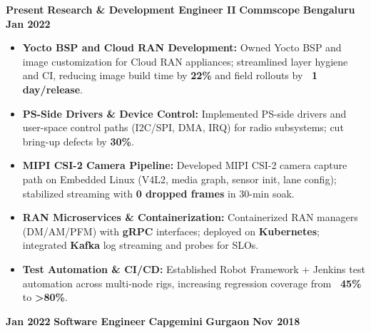 %
%
 \setlength{\parskip}{10pt plus 1pt minus 1pt}

\begin{experiences}
    \small
    \experience
        {\textbf{Present}}   %
        {\textbf{Research \& Development Engineer II}}  %
        {\textbf{Commscope}}  %
        {\textbf{Bengaluru}}  %
        {   %
            \textbf{Jan 2022}  %
        }
        {   %
            \begin{itemize}
                \item \textbf{Yocto BSP and Cloud RAN Development:} Owned Yocto BSP and image customization for Cloud RAN appliances; streamlined layer hygiene and CI, reducing image build time by \textbf{22\%} and field rollouts by \textbf{~1 day/release}.
                \item \textbf{PS-Side Drivers \& Device Control:} Implemented PS-side drivers and user-space control paths (I2C/SPI, DMA, IRQ) for radio subsystems; cut bring-up defects by \textbf{30\%}.
                \item \textbf{MIPI CSI-2 Camera Pipeline:} Developed MIPI CSI-2 camera capture path on Embedded Linux (V4L2, media graph, sensor init, lane config); stabilized streaming with \textbf{0 dropped frames} in 30-min soak.
                \item \textbf{RAN Microservices \& Containerization:} Containerized RAN managers (DM/AM/PFM) with \textbf{gRPC} interfaces; deployed on \textbf{Kubernetes}; integrated \textbf{Kafka} log streaming and probes for SLOs.
                \item \textbf{Test Automation \& CI/CD:} Established Robot Framework + Jenkins test automation across multi-node rigs, increasing regression coverage from \textbf{~45\%} to \textbf{>80\%}.
            \end{itemize}
        }
        {}
    \experience
        {\textbf{Jan 2022}}   %
        {\textbf{Software Engineer}}  %
        {\textbf{Capgemini}}  %
        {\textbf{Gurgaon}}  %
        {   %
            \textbf{Nov 2018}  %
        }
        {   %
            \begin{itemize}

\end{itemize}}
\end{experiences}
